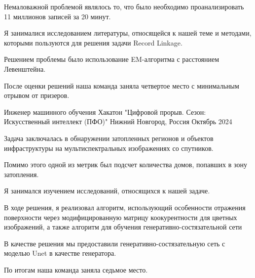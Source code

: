 \begin{cventries}
{\begin{cvitems}
    \item {Немаловажной проблемой являлось то, что было необходимо проанализировать 11 миллионов записей за 20 минут. }
    \item {Я занималися исследованием литературы, относящейся к нашей теме и методами, которыми пользуются для решения задачи Record Linkage. }
    \item {Решением проблемы было использование EM-алгоритма с расстоянием Левенштейна.}
    \item {После оценки решений наша команда заняла четвертое место с минимальным отрывом от призеров. }
  \end{cvitems}
}
\cventry
{Инженер машинного обучения} %
{Хакатон "Цифровой прорыв. Сезон: Искусственный интеллект (ПФО)"} %
{Нижний Новгород, Россия} %
{Октябрь 2024} %
{
  \begin{cvitems} %
    \item {Задача заключалась в обнаружении затопленных регионов и объектов инфраструктуры на мультиспектральных изображениях со спутников. }
    \item {Помимо этого одной из метрик был подсчет количества домов, попавших в зону затопления. }
    \item {Я занимался изучением исследований, относящихся к нашей задаче. }
    \item {В ходе решения, я реализовал алгоритм, использующий особенности отражения поверхности через модифицированную матрицу коокурентности для цветных изображений, а также алгоритм для обучения генеративно-состязательной сети}
    \item {В качестве решения мы предоставили генеративно-состязательную сеть с моделью Unet в качестве генератора. } 
    \item {По итогам наша команда заняла седьмое место. }
  \end{cvitems}
}
\end{cventries}
